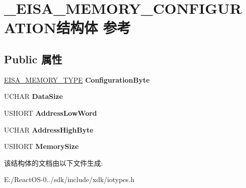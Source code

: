 \hypertarget{struct___e_i_s_a___m_e_m_o_r_y___c_o_n_f_i_g_u_r_a_t_i_o_n}{}\section{\+\_\+\+E\+I\+S\+A\+\_\+\+M\+E\+M\+O\+R\+Y\+\_\+\+C\+O\+N\+F\+I\+G\+U\+R\+A\+T\+I\+O\+N结构体 参考}
\label{struct___e_i_s_a___m_e_m_o_r_y___c_o_n_f_i_g_u_r_a_t_i_o_n}
\subsection*{Public 属性}
\begin{DoxyCompactItemize}
\item 
\mbox{\label{struct___e_i_s_a___m_e_m_o_r_y___c_o_n_f_i_g_u_r_a_t_i_o_n_ac9411151454054db3056427fb7f0fcd7}} 
\hyperlink{struct___e_i_s_a___m_e_m_o_r_y___t_y_p_e}{E\+I\+S\+A\+\_\+\+M\+E\+M\+O\+R\+Y\+\_\+\+T\+Y\+PE} {\bfseries Configuration\+Byte}
\item 
\mbox{\label{struct___e_i_s_a___m_e_m_o_r_y___c_o_n_f_i_g_u_r_a_t_i_o_n_aca65ca842d9157a041e87aba9683f11d}} 
U\+C\+H\+AR {\bfseries Data\+Size}
\item 
\mbox{\label{struct___e_i_s_a___m_e_m_o_r_y___c_o_n_f_i_g_u_r_a_t_i_o_n_ad8316a2212e3b288c774c478bd496cff}} 
U\+S\+H\+O\+RT {\bfseries Address\+Low\+Word}
\item 
\mbox{\label{struct___e_i_s_a___m_e_m_o_r_y___c_o_n_f_i_g_u_r_a_t_i_o_n_a36cf6d824d2a2a94bde50a02b2853c90}} 
U\+C\+H\+AR {\bfseries Address\+High\+Byte}
\item 
\mbox{\label{struct___e_i_s_a___m_e_m_o_r_y___c_o_n_f_i_g_u_r_a_t_i_o_n_aea89575fcba81eb7c81a05240092ea0a}} 
U\+S\+H\+O\+RT {\bfseries Memory\+Size}
\end{DoxyCompactItemize}


该结构体的文档由以下文件生成\+:\begin{DoxyCompactItemize}
\item 
E\+:/\+React\+O\+S-\/0../sdk/include/xdk/iotypes.\+h\end{DoxyCompactItemize}
